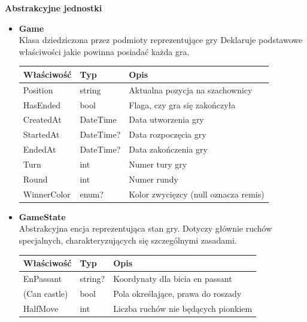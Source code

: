 \documentclass[twoside]{projektInzynierskiMS1}
\begin{document}
\newpage

\noindent \textbf{Abstrakcyjne jednostki}\\

\begin{itemize}
    \item \textbf{Game}\\
    Klasa dziedziczona przez podmioty reprezentujące gry Deklaruje podstawowe właściwości jakie powinna posiadać każda gra.
    \renewcommand{\arraystretch}{1.2}
    \begin{longtable}{|m{4cm}|m{2cm}|m{8cm}|}
        \hline
        \rowcolor{lightgray}
        \textbf{Właściwość} & \textbf{Typ} & \textbf{Opis} \\ \hline
        \endhead
        \hline
        Position & string & Aktualna pozycja na szachownicy \\ \hline
        HasEnded & bool & Flaga, czy gra się zakończyła \\ \hline
        CreatedAt & DateTime & Data utworzenia gry \\ \hline
        StartedAt & DateTime? & Data rozpoczęcia gry \\ \hline
        EndedAt & DateTime? & Data zakończenia gry \\ \hline
        Turn & int & Numer tury gry \\ \hline
        Round & int & Numer rundy \\ \hline
        WinnerColor & enum? & Kolor zwycięzcy (null oznacza remis) \\ \hline
    \end{longtable}

    \item \textbf{GameState}\\
    Abstrakcyjna encja reprezentująca stan gry. Dotyczy głównie ruchów specjalnych, charakteryzujących się szczególnymi zasadami.
    \renewcommand{\arraystretch}{1.2}
    \begin{longtable}{|m{4cm}|m{2cm}|m{8cm}|}
        \hline
        \rowcolor{lightgray}
        \textbf{Właściwość} & \textbf{Typ} & \textbf{Opis} \\ \hline
        \endhead
        \hline
        EnPassant & string? & Koordynaty dla bicia en passant \\ \hline
        (Can castle) & bool & Pola określające, prawa do roszady \\ \hline
        HalfMove & int & Liczba ruchów nie będących pionkiem  \\ \hline
    \end{longtable}


\end{itemize}
\end{document}
